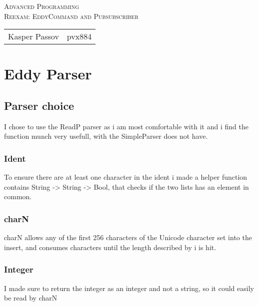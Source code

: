 \documentclass{article}
\begin{document}
\begin{titlepage}
\begin{center}
\textsc{\Large Advanced Programming}\\[0.5cm]
\textsc{Reexam: EddyCommand and Pubsubscriber}\\[0.5cm]
\vspace{2 cm}
\begin{tabular}{ll}
Kasper Passov & pvx884\\
\end{tabular}
\end{center}
\vspace{5 cm}
\newpage
\tableofcontents
\end{titlepage}

\section{Eddy Parser}

\subsection{Parser choice}

I chose to use the ReadP parser as i am most comfortable with it
and i find the function munch very usefull, with the SimpleParser
does not have.  

\subsubsection{Ident}

To ensure there are at least one character in the ident i 
made a helper function contains String -> String -> Bool,
that checks if the two lists has an element in common.

\subsubsection{charN}

charN allows any of the first 256 characters of the 
Unicode character set into the insert, and consumes 
characters until the length described by i is hit. 

\subsubsection{Integer}

I made sure to return the integer as an integer and not
a string, so it could easily be read by charN
\end{document}
